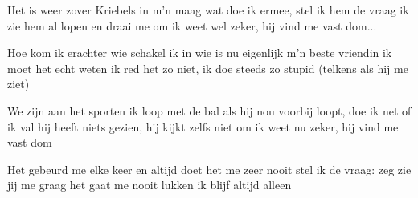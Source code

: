 \begin{verse*}
Het is weer zover
Kriebels in m'n maag
wat doe ik ermee, stel ik hem de vraag
ik zie hem al lopen en draai me om
ik weet wel zeker, hij vind me vast dom...
\end{verse*}

\begin{chorus}
Hoe kom ik erachter
wie schakel ik in
wie is nu eigenlijk m'n beste vriendin
ik moet het echt weten 
ik red het zo niet,
ik doe steeds zo stupid
(telkens als hij me ziet)
\end{chorus}

\thechorus

\begin{verse*}
We zijn aan het sporten 
ik loop met de bal
als hij nou voorbij loopt, doe ik net of ik val
hij heeft niets gezien, hij kijkt zelfs niet om
ik weet nu zeker, hij vind me vast dom
\end{verse*}

\thechorus[1]

\begin{verse*}
Het gebeurd me elke keer
en altijd doet het me zeer
nooit stel ik de vraag: zeg zie jij me graag
het gaat me nooit lukken
ik blijf altijd alleen
\end{verse*}

\thechorus[2]